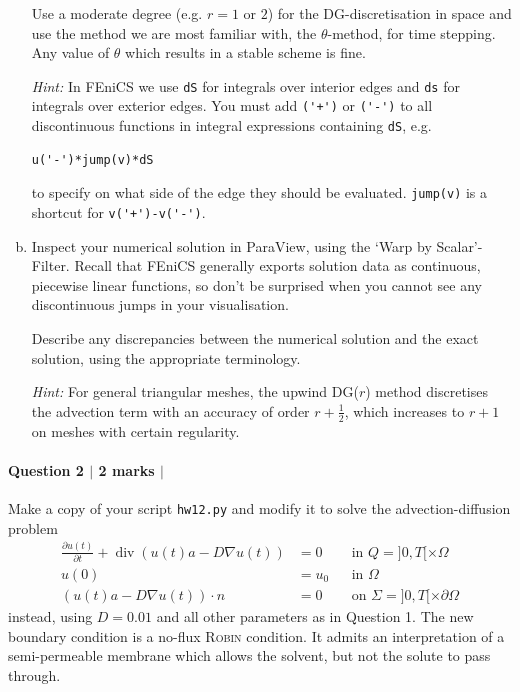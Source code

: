 \documentclass[10pt,letterpaper]{scrartcl}
\begin{document}
\begin{enumerate}[(a)]
Use a moderate degree (e.g. $r=1$ or $2$) for the DG-discretisation in space and use the method we are most familiar with, the $\theta$-method, for time stepping. Any value of $\theta$ which results in a stable scheme is fine.

\emph{Hint:} In \textsf{FEniCS} we use \verb|dS| for integrals over interior edges and \verb|ds| for integrals over exterior edges. You must add \verb|('+')| or \verb|('-')| to all discontinuous functions in integral expressions containing \verb|dS|, e.g.
\begin{verbatim}
u('-')*jump(v)*dS
\end{verbatim}
to specify on what side of the edge they should be evaluated. \verb|jump(v)| is a shortcut for \verb|v('+')-v('-')|.

\item Inspect your numerical solution in \textsf{ParaView}, using the `Warp by Scalar'-Filter. Recall that \textsf{FEniCS} generally exports solution data as continuous, piecewise linear functions, so don't be surprised when you cannot see any discontinuous jumps in your visualisation.

Describe any discrepancies between the numerical solution and the exact solution, using the appropriate terminology.

\emph{Hint: } For general triangular meshes, the upwind DG($r$) method discretises the advection term with an accuracy of order $r+\frac{1}{2}$, which increases to $r+1$ on meshes with certain regularity.

\end{enumerate}

\newpage

\paragraph*{Question 2 $\vert$ 2 marks $\vert$ \faFileCodeO{} \:}

Make a copy of your script \texttt{hw12.py} and modify it to solve the advection-diffusion problem
\begin{subequations}\label{eq:advection-diffusion}
\begin{align}
\frac{\partial u(t)}{\partial t} + \operatorname{div} (u(t)a - D\nabla u(t)) &= 0 && \text{in } Q = ]0,T[ \times \Omega\\
u(0) &= u_0 && \text{in } \Omega\\
\left(u(t)a-D\nabla u(t)\right) \cdot n &= 0 && \text{on } \Sigma = ]0,T[ \times \partial\Omega
\end{align}
\end{subequations}
instead, using $D = 0.01$ and all other parameters as in Question 1. The new boundary condition is a no-flux \textsc{Robin} condition. It admits an interpretation of a semi-permeable membrane which allows the solvent, but not the solute to pass through.
\end{document}
